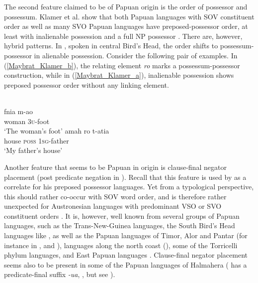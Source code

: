 The second feature claimed to be of Papuan origin is the order of possessor and possessum. Klamer et al. show that both Papuan languages with SOV constituent order as well as many SVO Papuan languages have preposed-possessor order, at least with inalienable possession and a full NP possessor \citep[123f.]{klamer2008east}. There are, however, hybrid patterns. In , spoken in central Bird's Head, the order shifts to possessum-possessor in alienable possession. Consider the following pair of examples. In (\ref{Maybrat_Klamer_b}), the relating element \textit{ro} marks a possessum-possessor construction, while in (\ref{Maybrat_Klamer_a}), inalienable possession shows preposed possessor order without any linking element.

\ea
{}\\
\ea \label{Maybrat_Klamer_a}
\gll fnia m-ao\\
woman \textsc{3}\textsc{u}-foot\\
\glt ‘The woman's foot’
\ex \label{Maybrat_Klamer_b}
\gll amah ro t-atia\\
house \textsc{poss} \textsc{1}\textsc{sg}-father\\
\glt ‘My father's house’
\z
\z

Another feature that seems to be Papuan in origin is clause-final negator placement (post predicate negation in \citealt{klamer2008east}). Recall that this feature is used by \citet{Himmelmann2005austronesian} as a correlate for his preposed possessor languages. Yet from a typological perspective, this should rather co-occur with SOV word order, and is therefore rather unexpected for Austronesian languages with predominant VSO or SVO constituent orders \citep{klamer2008east}. It is, however, well known from several groups of Papuan languages, such as the Trans-New-Guinea languages, the South Bird's Head languages like , as well as the Papuan languages of Timor, Alor and Pantar (for instance in ,  and ),  languages along the north coast (), some of the Torricelli phylum languages, and East Papuan languages \citep{klamer2008east}. Clause-final negator placement seems also to be present in some of the Papuan languages of Halmahera ( has a predicate-final suffix \textit{-ua}, \citealt{holton2003tobelo}, but see \citealt[131]{klamer2008east}).

